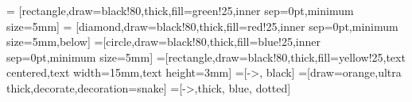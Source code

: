\documentclass[10pt,handout,notes=show]{beamer}
\begin{document}
\usetikzlibrary{shapes}
\usetikzlibrary{arrows,positioning,decorations.pathmorphing}
= [rectangle,draw=black!80,thick,fill=green!25,inner sep=0pt,minimum size=5mm]
=  [diamond,draw=black!80,thick,fill=red!25,inner sep=0pt,minimum size=5mm,below]
=[circle,draw=black!80,thick,fill=blue!25,inner sep=0pt,minimum size=5mm]
=[rectangle,draw=black!80,thick,fill=yellow!25,text centered,text width=15mm,text height=3mm]
=[->, black]
=[draw=orange,ultra thick,decorate,decoration=snake]
=[->,thick, blue, dotted]
\newcommand{\tikztext}[1]{\footnotesize{#1}}
\end{document}

